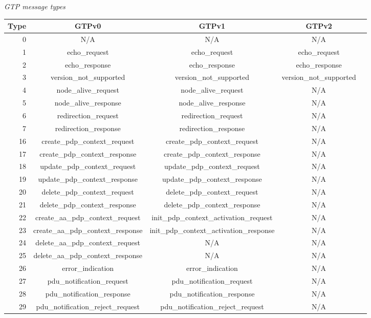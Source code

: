 \documentclass[english]{report}
\begin{document}
\begin{itemize}
\textit{GTP message types}
\small
\begin{longtable}{|r|c|c|c|p{13.5cm}|}
\hline
Type & GTPv0 & GTPv1 & GTPv2\\
\hline
0 & N/A & N/A & N/A\\
\hline
1 & echo\_request & echo\_request & echo\_request\\
\hline
2 & echo\_response & echo\_response & echo\_response\\
\hline
3 & version\_not\_supported & version\_not\_supported & version\_not\_supported\\
\hline
4 & node\_alive\_request & node\_alive\_request & N/A\\
\hline
5 & node\_alive\_response & node\_alive\_response & N/A\\
\hline
6 & redirection\_request & redirection\_request & N/A\\
\hline
7 & redirection\_response & redirection\_response & N/A \\
\hline
16 & create\_pdp\_context\_request & create\_pdp\_context\_request & N/A\\
\hline
17 & create\_pdp\_context\_response & create\_pdp\_context\_response & N/A \\
\hline
18 & update\_pdp\_context\_request & update\_pdp\_context\_request & N/A\\
\hline
19 & update\_pdp\_context\_response & update\_pdp\_context\_response & N/A\\
\hline
20 & delete\_pdp\_context\_request & delete\_pdp\_context\_request & N/A\\
\hline
21 & delete\_pdp\_context\_response & delete\_pdp\_context\_response & N/A\\
\hline
22 & create\_aa\_pdp\_context\_request & init\_pdp\_context\_activation\_request & N/A\\
\hline
23 & create\_aa\_pdp\_context\_response & init\_pdp\_context\_activation\_response & N/A\\
\hline
24 & delete\_aa\_pdp\_context\_request & N/A & N/A\\
\hline
25 & delete\_aa\_pdp\_context\_response & N/A & N/A\\
\hline
26 & error\_indication & error\_indication & N/A\\
\hline
27 & pdu\_notification\_request & pdu\_notification\_request & N/A\\
\hline
28 & pdu\_notification\_response & pdu\_notification\_response & N/A\\
\hline
29 & pdu\_notification\_reject\_request & pdu\_notification\_reject\_request & N/A\\

\end{longtable}
\end{itemize}
\end{document}
